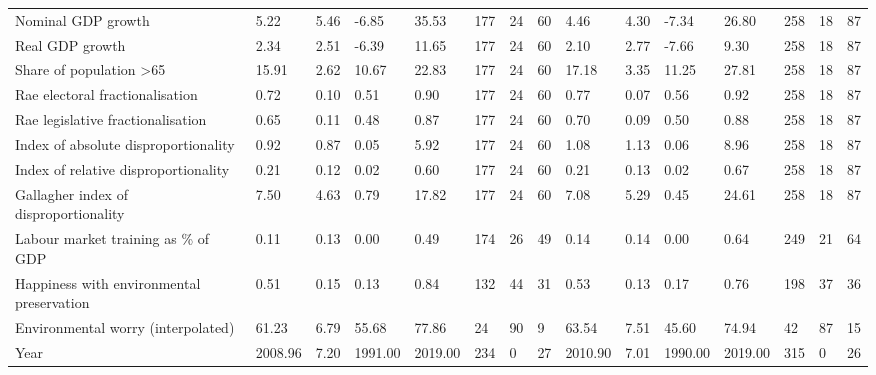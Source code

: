 \begin{longtable}{lllllllllllllll}
Nominal GDP growth & 5.22 & 5.46 & -6.85 & 35.53 & 177 & 24 & 60 & 4.46 & 4.30 & -7.34 & 26.80 & 258 & 18 & 87\\
Real GDP growth & 2.34 & 2.51 & -6.39 & 11.65 & 177 & 24 & 60 & 2.10 & 2.77 & -7.66 & 9.30 & 258 & 18 & 87\\
Share of population >65 & 15.91 & 2.62 & 10.67 & 22.83 & 177 & 24 & 60 & 17.18 & 3.35 & 11.25 & 27.81 & 258 & 18 & 87\\
\addlinespace
Rae electoral fractionalisation & 0.72 & 0.10 & 0.51 & 0.90 & 177 & 24 & 60 & 0.77 & 0.07 & 0.56 & 0.92 & 258 & 18 & 87\\
Rae legislative fractionalisation & 0.65 & 0.11 & 0.48 & 0.87 & 177 & 24 & 60 & 0.70 & 0.09 & 0.50 & 0.88 & 258 & 18 & 87\\
Index of absolute disproportionality & 0.92 & 0.87 & 0.05 & 5.92 & 177 & 24 & 60 & 1.08 & 1.13 & 0.06 & 8.96 & 258 & 18 & 87\\
Index of relative disproportionality & 0.21 & 0.12 & 0.02 & 0.60 & 177 & 24 & 60 & 0.21 & 0.13 & 0.02 & 0.67 & 258 & 18 & 87\\
Gallagher index of disproportionality & 7.50 & 4.63 & 0.79 & 17.82 & 177 & 24 & 60 & 7.08 & 5.29 & 0.45 & 24.61 & 258 & 18 & 87\\
\addlinespace
Labour market training as \% of GDP & 0.11 & 0.13 & 0.00 & 0.49 & 174 & 26 & 49 & 0.14 & 0.14 & 0.00 & 0.64 & 249 & 21 & 64\\
Happiness with environmental preservation & 0.51 & 0.15 & 0.13 & 0.84 & 132 & 44 & 31 & 0.53 & 0.13 & 0.17 & 0.76 & 198 & 37 & 36\\
Environmental worry (interpolated) & 61.23 & 6.79 & 55.68 & 77.86 & 24 & 90 & 9 & 63.54 & 7.51 & 45.60 & 74.94 & 42 & 87 & 15\\
Year & 2008.96 & 7.20 & 1991.00 & 2019.00 & 234 & 0 & 27 & 2010.90 & 7.01 & 1990.00 & 2019.00 & 315 & 0 & 26\\
\bottomrule
\end{longtable}
